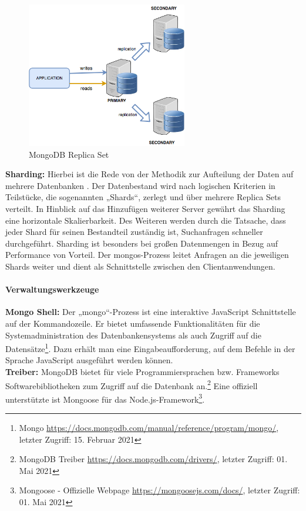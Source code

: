 \begin{figure}[tbt]
\centering
\includegraphics[width=7cm]{images/replicaset1.png}
\caption{MongoDB Replica Set}
\label{fig:ReplicaSet}
\end{figure}


\noindent
{}
\textbf{Sharding:}
Hierbei ist die Rede von der Methodik zur Aufteilung der Daten auf mehrere Datenbanken \cite{DB4.1}.
Der Datenbestand wird nach logischen Kriterien in  Teilstücke, die sogenannten „Shards“, zerlegt und über mehrere Replica Sets verteilt.
In Hinblick auf das Hinzufügen weiterer Server gewährt das Sharding eine horizontale Skalierbarkeit.
Des Weiteren werden durch die Tatsache, dass jeder Shard für seinen Bestandteil zuständig ist,  Suchanfragen schneller durchgeführt. 
Sharding ist besonders bei großen Datenmengen in Bezug auf Performance von Vorteil.
Der mongos-Prozess leitet Anfragen an die jeweiligen Shards weiter und dient als Schnittstelle zwischen den Clientanwendungen.

\paragraph{Verwaltungswerkzeuge}
\noindent
{}
\textbf{Mongo Shell:}
Der „mongo“-Prozess ist eine interaktive JavaScript Schnittstelle auf der Kommandozeile. Er bietet umfassende Funktionalitäten für die Systemadministration des Datenbankensystems als auch Zugriff auf die Datensätze\footnote{Mongo \url{https://docs.mongodb.com/manual/reference/program/mongo/}, letzter Zugriff: 15. Februar 2021}. Dazu erhält man eine Eingabeaufforderung, auf dem Befehle in der Sprache JavaScript ausgeführt werden können. \\

\noindent
{}
\textbf{Treiber:}
MongoDB bietet für viele Programmiersprachen bzw. Frameworks Softwarebibliotheken zum Zugriff auf die Datenbank an.\footnote{MongoDB Treiber \url{https://docs.mongodb.com/drivers/}, letzter Zugriff: 01. Mai 2021}  Eine offiziell unterstützte ist Mongoose für das Node.js-Framework\footnote{Mongoose - Offizielle Webpage \url{https://mongoosejs.com/docs/}, letzter Zugriff: 01. Mai 2021}. \\

